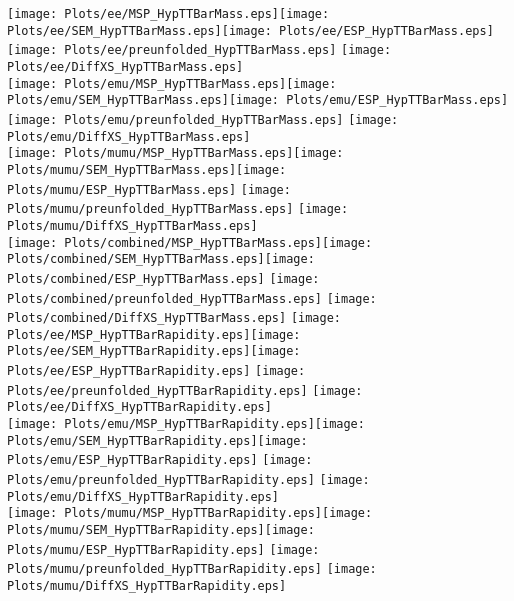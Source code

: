 \documentclass[a4paper,10pt,landscape,pagesize]{scrartcl}
\begin{document}
\newpage
\texttt{[image: Plots/ee/MSP\_HypTTBarMass.eps]}\texttt{[image: Plots/ee/SEM\_HypTTBarMass.eps]}\texttt{[image: Plots/ee/ESP\_HypTTBarMass.eps]} \texttt{[image: Plots/ee/preunfolded\_HypTTBarMass.eps]} \texttt{[image: Plots/ee/DiffXS\_HypTTBarMass.eps]}\\
\texttt{[image: Plots/emu/MSP\_HypTTBarMass.eps]}\texttt{[image: Plots/emu/SEM\_HypTTBarMass.eps]}\texttt{[image: Plots/emu/ESP\_HypTTBarMass.eps]} \texttt{[image: Plots/emu/preunfolded\_HypTTBarMass.eps]} \texttt{[image: Plots/emu/DiffXS\_HypTTBarMass.eps]}\\
\texttt{[image: Plots/mumu/MSP\_HypTTBarMass.eps]}\texttt{[image: Plots/mumu/SEM\_HypTTBarMass.eps]}\texttt{[image: Plots/mumu/ESP\_HypTTBarMass.eps]} \texttt{[image: Plots/mumu/preunfolded\_HypTTBarMass.eps]} \texttt{[image: Plots/mumu/DiffXS\_HypTTBarMass.eps]}\\
\texttt{[image: Plots/combined/MSP\_HypTTBarMass.eps]}\texttt{[image: Plots/combined/SEM\_HypTTBarMass.eps]}\texttt{[image: Plots/combined/ESP\_HypTTBarMass.eps]} \texttt{[image: Plots/combined/preunfolded\_HypTTBarMass.eps]} \texttt{[image: Plots/combined/DiffXS\_HypTTBarMass.eps]}
\newpage
\texttt{[image: Plots/ee/MSP\_HypTTBarRapidity.eps]}\texttt{[image: Plots/ee/SEM\_HypTTBarRapidity.eps]}\texttt{[image: Plots/ee/ESP\_HypTTBarRapidity.eps]} \texttt{[image: Plots/ee/preunfolded\_HypTTBarRapidity.eps]} \texttt{[image: Plots/ee/DiffXS\_HypTTBarRapidity.eps]}\\
\texttt{[image: Plots/emu/MSP\_HypTTBarRapidity.eps]}\texttt{[image: Plots/emu/SEM\_HypTTBarRapidity.eps]}\texttt{[image: Plots/emu/ESP\_HypTTBarRapidity.eps]} \texttt{[image: Plots/emu/preunfolded\_HypTTBarRapidity.eps]} \texttt{[image: Plots/emu/DiffXS\_HypTTBarRapidity.eps]}\\
\texttt{[image: Plots/mumu/MSP\_HypTTBarRapidity.eps]}\texttt{[image: Plots/mumu/SEM\_HypTTBarRapidity.eps]}\texttt{[image: Plots/mumu/ESP\_HypTTBarRapidity.eps]} \texttt{[image: Plots/mumu/preunfolded\_HypTTBarRapidity.eps]} \texttt{[image: Plots/mumu/DiffXS\_HypTTBarRapidity.eps]}\\
\end{document}
